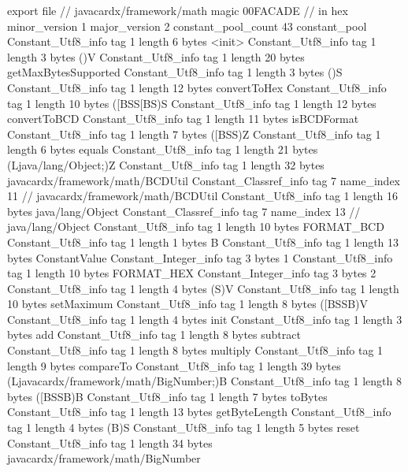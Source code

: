export file {		// javacardx/framework/math
	magic	00FACADE		 // in hex
	minor_version	1
	major_version	2
	constant_pool_count	43
	constant_pool {
		Constant_Utf8_info {
			tag	1
			length	6
			bytes	<init>
		}
		Constant_Utf8_info {
			tag	1
			length	3
			bytes	()V
		}
		Constant_Utf8_info {
			tag	1
			length	20
			bytes	getMaxBytesSupported
		}
		Constant_Utf8_info {
			tag	1
			length	3
			bytes	()S
		}
		Constant_Utf8_info {
			tag	1
			length	12
			bytes	convertToHex
		}
		Constant_Utf8_info {
			tag	1
			length	10
			bytes	([BSS[BS)S
		}
		Constant_Utf8_info {
			tag	1
			length	12
			bytes	convertToBCD
		}
		Constant_Utf8_info {
			tag	1
			length	11
			bytes	isBCDFormat
		}
		Constant_Utf8_info {
			tag	1
			length	7
			bytes	([BSS)Z
		}
		Constant_Utf8_info {
			tag	1
			length	6
			bytes	equals
		}
		Constant_Utf8_info {
			tag	1
			length	21
			bytes	(Ljava/lang/Object;)Z
		}
		Constant_Utf8_info {
			tag	1
			length	32
			bytes	javacardx/framework/math/BCDUtil
		}
		Constant_Classref_info {
			tag	7
			name_index	11		// javacardx/framework/math/BCDUtil
		}
		Constant_Utf8_info {
			tag	1
			length	16
			bytes	java/lang/Object
		}
		Constant_Classref_info {
			tag	7
			name_index	13		// java/lang/Object
		}
		Constant_Utf8_info {
			tag	1
			length	10
			bytes	FORMAT_BCD
		}
		Constant_Utf8_info {
			tag	1
			length	1
			bytes	B
		}
		Constant_Utf8_info {
			tag	1
			length	13
			bytes	ConstantValue
		}
		Constant_Integer_info {
			tag	3
			bytes	1
		}
		Constant_Utf8_info {
			tag	1
			length	10
			bytes	FORMAT_HEX
		}
		Constant_Integer_info {
			tag	3
			bytes	2
		}
		Constant_Utf8_info {
			tag	1
			length	4
			bytes	(S)V
		}
		Constant_Utf8_info {
			tag	1
			length	10
			bytes	setMaximum
		}
		Constant_Utf8_info {
			tag	1
			length	8
			bytes	([BSSB)V
		}
		Constant_Utf8_info {
			tag	1
			length	4
			bytes	init
		}
		Constant_Utf8_info {
			tag	1
			length	3
			bytes	add
		}
		Constant_Utf8_info {
			tag	1
			length	8
			bytes	subtract
		}
		Constant_Utf8_info {
			tag	1
			length	8
			bytes	multiply
		}
		Constant_Utf8_info {
			tag	1
			length	9
			bytes	compareTo
		}
		Constant_Utf8_info {
			tag	1
			length	39
			bytes	(Ljavacardx/framework/math/BigNumber;)B
		}
		Constant_Utf8_info {
			tag	1
			length	8
			bytes	([BSSB)B
		}
		Constant_Utf8_info {
			tag	1
			length	7
			bytes	toBytes
		}
		Constant_Utf8_info {
			tag	1
			length	13
			bytes	getByteLength
		}
		Constant_Utf8_info {
			tag	1
			length	4
			bytes	(B)S
		}
		Constant_Utf8_info {
			tag	1
			length	5
			bytes	reset
		}
		Constant_Utf8_info {
			tag	1
			length	34
			bytes	javacardx/framework/math/BigNumber
}}}
